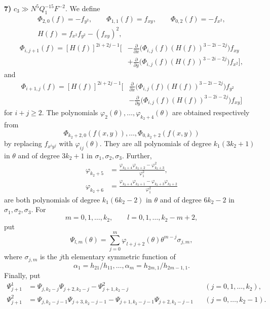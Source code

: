 \documentclass[10pt]{article}
\begin{document}
\medskip
\noindent\textbf{7)} $c_3\gg N^5Q_1^{-15}F^{-2}$. We define
\[
\begin{gathered}
 \Phi_{2,0}(f)=-f_{y^2},\qquad
 \Phi_{1,1}(f)=f_{xy},\qquad
 \Phi_{0,2}(f)=-f_{x^2},\\
 H(f)=f_{x^2}f_{y^2}-(f_{xy})^2,
\end{gathered}
\]
\[
\begin{aligned}
\Phi_{i,j+1}(f)=[H(f)]^{2i+2j-1}\Bigg[&
 -\frac{\partial}{\partial x}
  \bigl(\Phi_{i,j}(f)(H(f))^{3-2i-2j}\bigr)f_{xy}\\
&+\frac{\partial}{\partial y}
  \bigl(\Phi_{i,j}(f)(H(f))^{3-2i-2j}\bigr)f_{x^2}
\Bigg],
\end{aligned}
\]
and
\[
\begin{aligned}
\Phi_{i+1,j}(f)=[H(f)]^{2i+2j-1}\Bigg[&
 \frac{\partial}{\partial x}
  \bigl(\Phi_{i,j}(f)(H(f))^{3-2i-2j}\bigr)f_{y^2}\\
&-\frac{\partial}{\partial y}
  \bigl(\Phi_{i,j}(f)(H(f))^{3-2i-2j}\bigr)f_{xy}
\Bigg]
\end{aligned}
\]
for $i+j\geqslant2$. The polynomials
$\varphi_2(\theta),\ldots,\varphi_{k_2+4}(\theta)$ are obtained respectively from
\[
  \Phi_{k_2+2,0}(f(x,y)),\ldots,\Phi_{0,k_2+2}(f(x,y))
\]
by replacing $f_{x^iy^j}$ with $\varphi_{ij}(\theta)$. They are all polynomials of degree $k_1(3k_2+1)$ in $\theta$ and of degree $3k_2+1$ in $\sigma_1,\sigma_2,\sigma_3$. Further,
\[
\begin{aligned}
 \varphi_{k_2+5}
 &=\frac{\varphi_{k_2+4}\varphi_{k_2+2}-\varphi_{k_2+3}^2}
        {\varphi_1^2},\\
 \varphi_{k_2+6}
 &=\frac{\varphi_{k_2+4}\varphi_{k_2+1}
          -\varphi_{k_2+3}\varphi_{k_2+2}}
        {\varphi_1^2}
\end{aligned}
\]
are both polynomials of degree $k_1(6k_2-2)$ in $\theta$ and of degree $6k_2-2$ in $\sigma_1,\sigma_2,\sigma_3$. For
\[
  m=0,1,\ldots,k_2,
  \qquad l=0,1,\ldots,k_2-m+2,
\]
put
\[
  \Psi_{l,m}(\theta)=\sum_{j=0}^m
  \varphi_{l+j+2}(\theta)\theta^{m-j}\sigma_{j,m},
\]
where $\sigma_{j,m}$ is the $j$th elementary symmetric function of
\[
  \alpha_1=h_{21}/h_{11},\ldots,
  \alpha_m=h_{2m,1}/h_{2m-1,1}.
\]
Finally, put
\[
\begin{aligned}
 \Psi_{j+1}^1
 &=\Psi_{j,k_2-j}\Psi_{j+2,k_2-j}
   -\Psi_{j+1,k_2-j}^2
 &&(j=0,1,\ldots,k_2),\\
 \Psi_{j+1}^2
 &=\Psi_{j,k_2-j-1}\Psi_{j+3,k_2-j-1}
   -\Psi_{j+1,k_2-j-1}\Psi_{j+2,k_2-j-1}
 &&(j=0,\ldots,k_2-1).
\end{aligned}
\]
\end{document}
